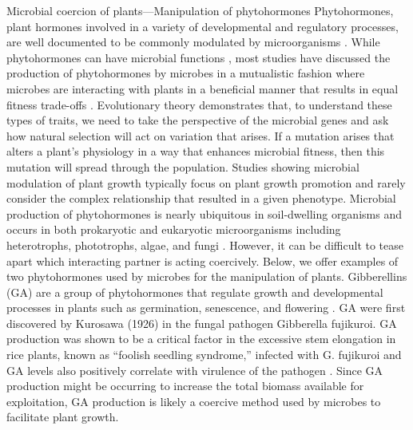 \documentclass[PhD]{msu-thesis}
\begin{document}
Microbial coercion of plants—Manipulation of phytohormones 
Phytohormones, plant hormones involved in a variety of developmental and regulatory processes, are well documented to be commonly modulated by microorganisms \cite{chanclud2016}. While phytohormones can have microbial functions \cite{glick2020}, most studies have discussed the production of phytohormones by microbes in a mutualistic fashion where microbes are interacting with plants in a beneficial manner that results in equal fitness trade-offs \cite{hardoim2008}. Evolutionary theory demonstrates that, to understand these types of traits, we need to take the perspective of the microbial genes and ask how natural selection will act on variation that arises. If a mutation arises that alters a plant’s physiology in a way that enhances microbial fitness, then this mutation will spread through the population. Studies showing microbial modulation of plant growth typically focus on plant growth promotion and rarely consider the complex relationship that resulted in a given phenotype. Microbial production of phytohormones is nearly ubiquitous in soil-dwelling organisms and occurs in both prokaryotic and eukaryotic microorganisms including heterotrophs, phototrophs, algae, and fungi \cite{tsavkelova2005}. However, it can be difficult to tease apart which interacting partner is acting coercively. Below, we offer examples of two phytohormones used by microbes for the manipulation of plants.  
Gibberellins (GA) are a group of phytohormones that regulate growth and developmental processes in plants such as germination, senescence, and flowering \cite{sun2010}. GA were first discovered by Kurosawa (1926) in the fungal pathogen Gibberella fujikuroi. GA production was shown to be a critical factor in the excessive stem elongation in rice plants, known as “foolish seedling syndrome,” infected with G. fujikuroi and GA levels also positively correlate with virulence of the pathogen \cite{desjardins2000}. Since GA production might be occurring to increase the total biomass available for exploitation, GA production is likely a coercive method used by microbes to facilitate plant growth. 
\end{document}
